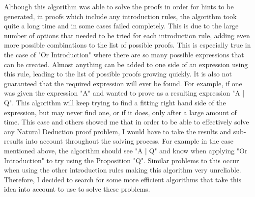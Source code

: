 Although this algorithm was able to solve the proofs in order for hints to be generated, in proofs which include any introduction rules, the algorithm took quite a long time and in some cases failed completely. This is due to the large number of options that needed to be tried for each introduction rule, adding even more possible combinations to the list of possible proofs. This is especially true in the case of "Or Introduction" where there are so many possible expressions that can be created. Almost anything can be added to one side of an expression using this rule, leading to the list of possible proofs growing quickly. It is also not guaranteed that the required expression will ever be found. For example, if one was given the expression "A" and wanted to prove as a resulting expression "A | Q". This algorithm will keep trying to find a fitting right hand side of the expression, but may never find one, or if it does, only after a large amount of time. This case and others showed me that in order to be able to effectively solve any Natural Deduction proof problem, I would have to take the results and sub-results into account throughout the solving process. For example in the case mentioned above, the algorithm should see "A | Q" and know when applying "Or Introduction" to try using the Proposition "Q". Similar problems to this occur when using the other introduction rules making this algorithm very unreliable. Therefore, I decided to search for some more efficient algorithms that take this idea into account to use to solve these problems.

